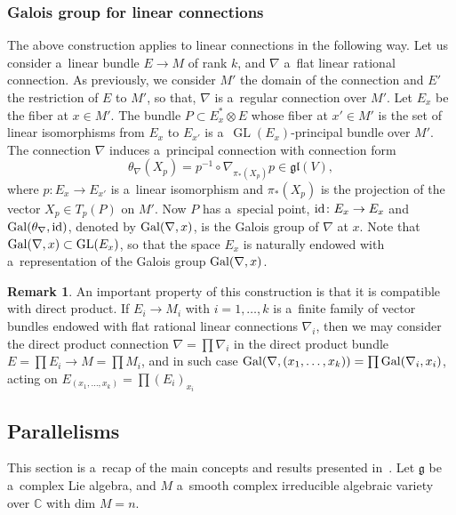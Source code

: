 \documentclass[pdftex]{sigma}
\numberwithin{equation}{section}
\theoremstyle{definition}
\newtheorem{Remark}[Theorem]{Remark}
\begin{document}
\subsubsection{Galois group for linear connections}

The above construction applies to linear connections in the following way. Let us consider a~linear bundle $E\to M$ of rank $k$, and $\nabla$ a~flat linear rational connection. As previously, we consider $M'$ the domain of the connection and $E'$ the restriction of $E$ to $M'$, so that, $\nabla$ is a~regular connection over $M'$.
Let $E_x$ be the fiber at $x \in M'$. The bundle $P \subset E_x^\ast \otimes E$ whose fiber at $x' \in M'$ is the set of linear isomorphisms from $E_x$ to $E_{x'}$ is a~$\operatorname{GL}(E_x)$-principal bundle over $M'$. The connection $\nabla$ induces a~principal connection with connection form
\[
\theta_\nabla(X_p) = p^{-1} \circ \nabla_{\pi_*(X_p)} p \in \mathfrak{gl}(V),
\]
where $p \colon E_x \to E_{x'}$ is a~linear isomorphism and $\pi_*(X_p)$ is the projection of the vector $X_p\in T_p(P)$ on $M'$. Now $P$ has a~special point, ${\rm id} \colon E_x \to E_x$ and ${\rm Gal}(\theta_\nabla, {\rm id})$, denoted by ${\rm Gal}(\nabla, x)$, is the Galois group of $\nabla$ at $x$. Note that ${\rm Gal}(\nabla, x)\subset \operatorname{GL}(E_x)$, so that the space $E_x$ is naturally endowed with a~representation of the Galois group ${\rm Gal}(\nabla, x)$.

\begin{Remark}\label{rmk_products}
An important property of this construction is that it is compatible with direct product. If $E_i\to M_i$
with $i=1,\dots, k$ is a~finite family of vector bundles endowed with flat rational linear connections $\nabla_i$, then we may consider the direct product connection $\nabla = \prod \nabla_i$ in the direct product bundle $E = \prod E_i \to M = \prod M_i$, and in such case ${\rm Gal}(\nabla, (x_1,\dots,x_k)) = \prod {\rm Gal}(\nabla_i, x_i)$, acting on $E_{(x_1,\dots,x_k)}= \prod (E_i)_{x_i}$
\end{Remark}

\subsection{Parallelisms}

This section is a~recap of the main concepts and results presented in~\cite{bc2017}. Let $\mathfrak g$ be a~complex Lie algebra, and $M$ a~smooth complex irreducible algebraic variety over $\mathbb C$ with dim $M = n$.
\end{document}
